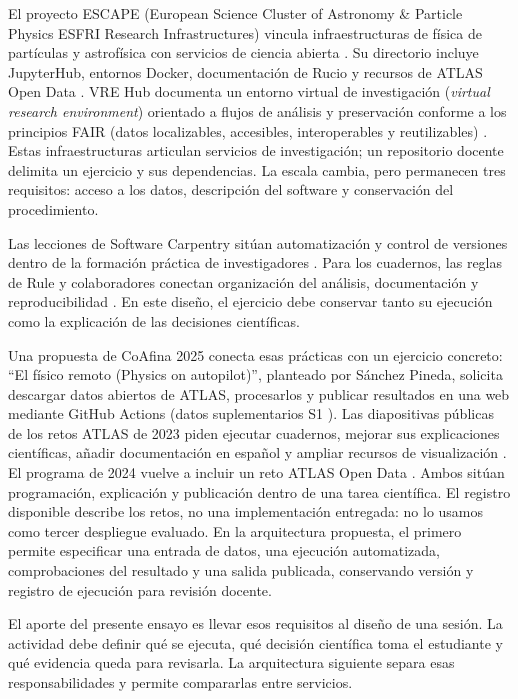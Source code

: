El proyecto ESCAPE (European Science Cluster of Astronomy \& Particle Physics ESFRI Research Infrastructures) vincula infraestructuras de física de partículas y astrofísica con servicios de ciencia abierta \cite{escape}. Su directorio incluye JupyterHub, entornos Docker, documentación de Rucio y recursos de ATLAS Open Data \cite{escapetools}. VRE Hub documenta un entorno virtual de investigación (\emph{virtual research environment}) orientado a flujos de análisis y preservación conforme a los principios FAIR (datos localizables, accesibles, interoperables y reutilizables) \cite{vrehub}. Estas infraestructuras articulan servicios de investigación; un repositorio docente delimita un ejercicio y sus dependencias. La escala cambia, pero permanecen tres requisitos: acceso a los datos, descripción del software y conservación del procedimiento.

Las lecciones de Software Carpentry sitúan automatización y control de versiones dentro de la formación práctica de investigadores \cite{carpentries}. Para los cuadernos, las reglas de Rule y colaboradores conectan organización del análisis, documentación y reproducibilidad \cite{notebookrules}. En este diseño, el ejercicio debe conservar tanto su ejecución como la explicación de las decisiones científicas.

Una propuesta de CoAfina 2025 conecta esas prácticas con un ejercicio concreto: ``El físico remoto (Physics on autopilot)'', planteado por Sánchez Pineda, solicita descargar datos abiertos de ATLAS, procesarlos y publicar resultados en una web mediante GitHub Actions (datos suplementarios S1 \cite{s1}). Las diapositivas públicas de los retos ATLAS de 2023 piden ejecutar cuadernos, mejorar sus explicaciones científicas, añadir documentación en español y ampliar recursos de visualización \cite{retosatlas2023}. El programa de 2024 vuelve a incluir un reto ATLAS Open Data \cite{programa2024}. Ambos sitúan programación, explicación y publicación dentro de una tarea científica. El registro disponible describe los retos, no una implementación entregada: no lo usamos como tercer despliegue evaluado. En la arquitectura propuesta, el primero permite especificar una entrada de datos, una ejecución automatizada, comprobaciones del resultado y una salida publicada, conservando versión y registro de ejecución para revisión docente.

El aporte del presente ensayo es llevar esos requisitos al diseño de una sesión. La actividad debe definir qué se ejecuta, qué decisión científica toma el estudiante y qué evidencia queda para revisarla. La arquitectura siguiente separa esas responsabilidades y permite compararlas entre servicios.
